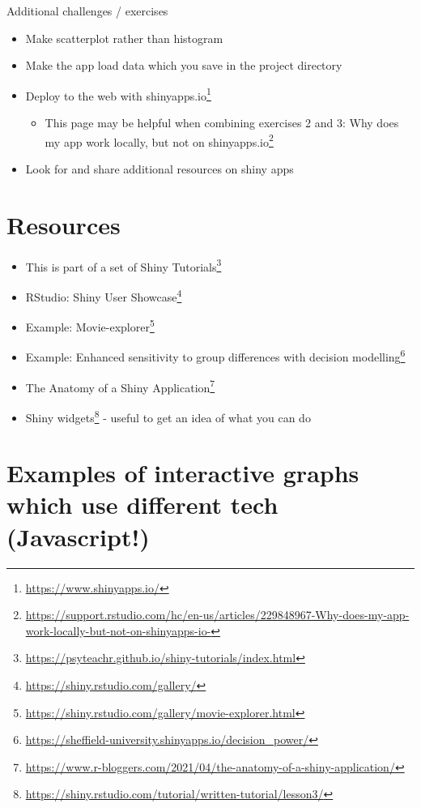 \documentclass[
  12pt,
  a5paper,
]{book}
\DeclareRobustCommand{\href}[2]{#2\footnote{\url{#1}}}
\providecommand{\tightlist}{%
  \setlength{\itemsep}{0pt}\setlength{\parskip}{0pt}}
\begin{document}
Additional challenges / exercises

\begin{itemize}
\tightlist
\item
  Make scatterplot rather than histogram
\item
  Make the app load data which you save in the project directory
\item
  Deploy to the web with \href{https://www.shinyapps.io/}{shinyapps.io}

  \begin{itemize}
  \tightlist
  \item
    This page may be helpful when combining exercises 2 and 3: \href{https://support.rstudio.com/hc/en-us/articles/229848967-Why-does-my-app-work-locally-but-not-on-shinyapps-io-}{Why does my app work locally, but not on shinyapps.io}
  \end{itemize}
\item
  Look for and share additional resources on shiny apps
\end{itemize}

\hypertarget{resources-10}{%
\section{Resources}\label{resources-10}}

\begin{itemize}
\tightlist
\item
  This is part of a set of \href{https://psyteachr.github.io/shiny-tutorials/index.html}{Shiny Tutorials}
\item
  RStudio: \href{https://shiny.rstudio.com/gallery/}{Shiny User Showcase}
\item
  Example: \href{https://shiny.rstudio.com/gallery/movie-explorer.html}{Movie-explorer}
\item
  Example: \href{https://sheffield-university.shinyapps.io/decision_power/}{Enhanced sensitivity to group differences with decision modelling}
\item
  \href{https://www.r-bloggers.com/2021/04/the-anatomy-of-a-shiny-application/}{The Anatomy of a Shiny Application}
\item
  \href{https://shiny.rstudio.com/tutorial/written-tutorial/lesson3/}{Shiny widgets} - useful to get an idea of what you can do
\end{itemize}

\hypertarget{examples-of-interactive-graphs-which-use-different-tech-javascript}{%
\section{Examples of interactive graphs which use different tech (Javascript!)}\label{examples-of-interactive-graphs-which-use-different-tech-javascript}}
\end{document}
